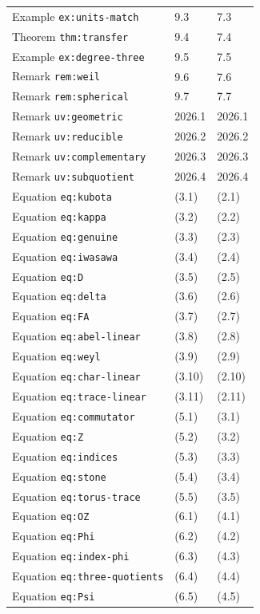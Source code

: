 \documentclass[12pt,letterpaper]{article}
\begin{document}
{\begin{longtable}{@{}lll@{}}
Example \texttt{ex:units-match} & 9.3 & 7.3\\
Theorem \texttt{thm:transfer} & 9.4 & 7.4\\
Example \texttt{ex:degree-three} & 9.5 & 7.5\\
Remark \texttt{rem:weil} & 9.6 & 7.6\\
Remark \texttt{rem:spherical} & 9.7 & 7.7\\
Remark \texttt{uv:geometric} & 2026.1 & 2026.1\\
Remark \texttt{uv:reducible} & 2026.2 & 2026.2\\
Remark \texttt{uv:complementary} & 2026.3 & 2026.3\\
Remark \texttt{uv:subquotient} & 2026.4 & 2026.4\\
Equation \texttt{eq:kubota} & (3.1) & (2.1)\\
Equation \texttt{eq:kappa} & (3.2) & (2.2)\\
Equation \texttt{eq:genuine} & (3.3) & (2.3)\\
Equation \texttt{eq:iwasawa} & (3.4) & (2.4)\\
Equation \texttt{eq:D} & (3.5) & (2.5)\\
Equation \texttt{eq:delta} & (3.6) & (2.6)\\
Equation \texttt{eq:FA} & (3.7) & (2.7)\\
Equation \texttt{eq:abel-linear} & (3.8) & (2.8)\\
Equation \texttt{eq:weyl} & (3.9) & (2.9)\\
Equation \texttt{eq:char-linear} & (3.10) & (2.10)\\
Equation \texttt{eq:trace-linear} & (3.11) & (2.11)\\
Equation \texttt{eq:commutator} & (5.1) & (3.1)\\
Equation \texttt{eq:Z} & (5.2) & (3.2)\\
Equation \texttt{eq:indices} & (5.3) & (3.3)\\
Equation \texttt{eq:stone} & (5.4) & (3.4)\\
Equation \texttt{eq:torus-trace} & (5.5) & (3.5)\\
Equation \texttt{eq:OZ} & (6.1) & (4.1)\\
Equation \texttt{eq:Phi} & (6.2) & (4.2)\\
Equation \texttt{eq:index-phi} & (6.3) & (4.3)\\
Equation \texttt{eq:three-quotients} & (6.4) & (4.4)\\
Equation \texttt{eq:Psi} & (6.5) & (4.5)\\

\end{longtable}}
\end{document}
